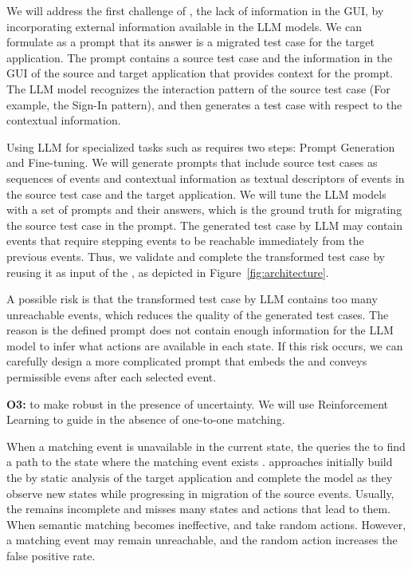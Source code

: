 \smallskip
We will  address the first challenge of \testreuse, the lack of information in the GUI, by incorporating external information available in the LLM models.
We can formulate \testreuse as a prompt that its answer is a migrated test case for the target application.
The prompt contains a source test case and the information in the GUI of the source and target application that provides context for the prompt. 
The LLM model recognizes the interaction pattern of the source test case (For example, the Sign-In pattern), and then generates a test case with respect to the contextual information.


\smallskip
Using LLM for specialized tasks such as \testreuse requires two steps: Prompt Generation and Fine-tuning. 
We will generate prompts that include source test cases as sequences of events and contextual information as textual descriptors of events in the source test case and the target application.
We will tune the LLM models with a set of prompts and their answers, which is the ground truth for migrating the source test case in the prompt.
The generated test case by LLM may contain events that require stepping events to be reachable immediately from the previous events.
 Thus, we validate and complete the transformed test case by reusing it as input of the \selector, as depicted in Figure~\ref{fig:architecture}. 



\smallskip
A possible risk is that the transformed test case by LLM contains too many unreachable events, which reduces the quality of the generated test cases.
The reason is the defined prompt does not contain enough information  for the LLM model to infer what actions are available in each state.
If this risk occurs, we can carefully design a more complicated prompt that embeds the \tam and conveys permissible evens after each selected event.




\bigskip 
\noindent
\textbf{O3:} to make \testreuse robust in the presence of uncertainty. We will use Reinforcement Learning to guide \testreuse in the absence of one-to-one matching. 

\smallskip
When a matching event is unavailable in the current state, the \selector queries the \tam to find a path to the state where the matching event exists	.
\testreuse approaches initially build the \tam by static analysis of the target application and complete the model as they observe new states while progressing in migration of the source events. 
Usually, the \tam remains incomplete and misses many states and actions that lead to them.
When semantic matching becomes ineffective, \atm and \adaptdroid take random actions.  However, a matching event may remain unreachable, and the random action increases the false positive rate. 


